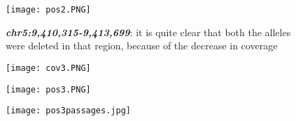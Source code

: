 \begin{figure}[H]
    \caption{\textbf{\textit{chr5:9,410,315-9,413,699}}: it is quite clear that
    both the alleles were deleted in that region, because of the decrease in
    coverage}
    \centering
    \texttt{[image: pos2.PNG]}
\end{figure}


\begin{figure}[H]
   \centering
   \texttt{[image: cov3.PNG]}
\end{figure}

\begin{figure}[H]
  \centering
  \texttt{[image: pos3.PNG]}
\end{figure}

 \begin{figure}[H]
   \centering
   \texttt{[image: pos3passages.jpg]}
    \end{figure}


